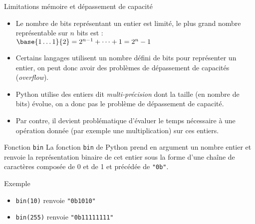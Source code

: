 \documentclass[10pt]{beamer}
\begin{document}
\begin{frame}{\Ctitle}{\stitle}
	\begin{block}{Limitations mémoire et dépassement de capacité}
		\begin{itemize}
			\item<1-> Le nombre de bits représentant un entier est limité, le plus grand nombre représentable sur $n$ bits est : \\
				$\base{1\dots1}{2} = 2^{n-1} + \dots + 1 = 2^{n}-1$
			\item<2-> Certains langages utilisent un nombre défini de bits pour représenter un entier, on peut donc avoir des problèmes de dépassement de capacités (\textit{overflow}).
			\item<3-> Python utilise des entiers dit \textit{multi-précision} dont la taille (en nombre de bits) évolue, on a donc pas le problème de dépassement de capacité.
			\item<4-> Par contre, il devient problématique d'évaluer le temps nécessaire à une opération donnée (par exemple une multiplication) sur ces entiers.
		\end{itemize}
	\end{block}
\end{frame}


\begin{frame}{\Ctitle}{\stitle}
	\begin{alertblock}{Fonction {\tt bin}}
        La fonction \texttt{bin} de Python prend en argument un nombre entier et renvoie la représentation binaire de cet entier sous la forme d'une chaîne de caractères composée de 0 et de 1 et précédée de \texttt{"0b"}.
	\end{alertblock}
        {\begin{exampleblock}{Exemple}
        \begin{itemize}
            \item \texttt{bin(10)} renvoie \texttt{"0b1010"}
            \item \texttt{bin(255)} renvoie \texttt{"0b11111111"}
        \end{itemize}
        \end{exampleblock}}
\end{frame}
\end{document}
